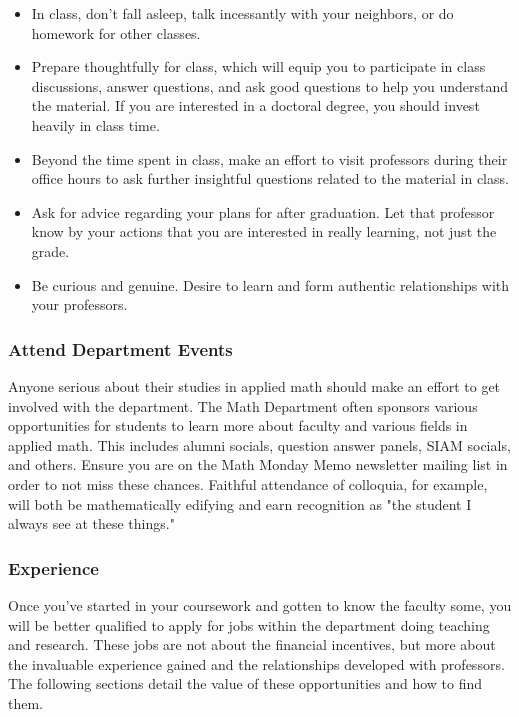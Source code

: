 \documentclass[11pt]{article}
\begin{document}
\begin{itemize}
\item In class, don’t fall asleep, talk incessantly with your neighbors, or do homework for other classes. 
\item Prepare thoughtfully for class, which will equip you to participate in class discussions, answer questions, and ask good questions to help you understand the material. If you are interested in a doctoral degree, you should invest heavily in class time.
\item Beyond the time spent in class, make an effort to visit professors during their office hours to ask further insightful questions related to the material in class. 
\item Ask for advice regarding your plans for after graduation. Let that professor know by your actions that you are interested in really learning, not just the grade. 
\item Be curious and genuine. Desire to learn and form authentic relationships with your professors. 
\end{itemize}

\subsubsection*{Attend Department Events}
Anyone serious about their studies in applied math should make an effort to get involved with the department. The Math Department often sponsors various opportunities for students to learn more about faculty and various fields in applied math. This includes alumni socials, question answer panels, SIAM socials, and others. Ensure you are on the Math Monday Memo newsletter mailing list in order to not miss these chances. Faithful attendance of colloquia, for example, will both be mathematically edifying and earn recognition as "the student I always see at these things."

\subsubsection*{Experience}
Once you’ve started in your coursework and gotten to know the faculty some, you will be better qualified to apply for jobs within the department doing teaching and research. These jobs are not about the financial incentives, but more about the invaluable experience gained and the relationships developed with professors. The following sections detail the value of these opportunities and how to find them.
\end{document}
